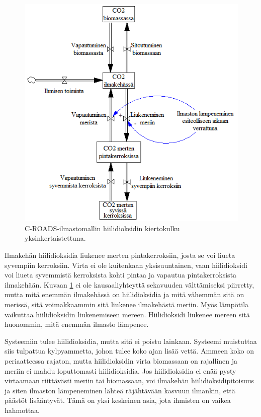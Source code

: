 \documentclass[finnish,12pt,a4paper,pdftex]{article}
\begin{document}
\begin{onehalfspacing}
\begin{figure}[ht]
\centering \includegraphics{c-roads-co2}
\caption{C-ROADS-ilmastomallin hiilidioksidin kiertokulku yksinkertaistettuna. \cite{Croads} \label{ilmasto:co2}}
\end{figure}

Ilmakehän hiilidioksidia liukenee merten pintakerroksiin, josta se voi liueta syvempiin kerroksiin. Virta ei ole kuitenkaan yksisuuntainen, vaan hiilidioksidi voi liueta syvemmistä kerroksista kohti pintaa ja vapautua pintakerroksista ilmakehään. Kuvaan \ref{ilmasto:co2} ei ole kausaaliyhteyttä sekavuuden välttämiseksi piirretty, mutta mitä enemmän ilmakehässä on hiilidioksidia ja mitä vähemmän sitä on merissä, sitä voimakkaammin sitä liukenee ilmakehästä meriin. Myös lämpötila vaikuttaa hiilidioksidin liukenemiseen mereen. Hiilidioksidi liukenee mereen sitä huonommin, mitä enemmän ilmasto lämpenee. \cite{Croads, CroadsFlightSimulator2011}

Systeemiin tulee hiilidioksidia, mutta sitä ei poistu lainkaan. Systeemi muistuttaa siis tulpattua kylpyammetta, johon tulee koko ajan lisää vettä. Ammeen koko on periaatteessa rajaton, mutta hiilidioksidin virta biomassaan on rajallinen ja meriin ei mahdu loputtomasti hiilidioksidia. Jos hiilidioksidia ei enää pysty virtaamaan riittävästi meriin tai biomassaan, voi ilmakehän hiilidioksidipitoisuus ja siten ilmaston lämpeneminen lähteä räjähtävään kasvuun ilmankin, että päästöt lisääntyvät. Tämä on yksi keskeinen asia, jota ihmisten on vaikea hahmottaa. \cite{CroadsFlightSimulator2011} 


\end{onehalfspacing}
\end{document}

